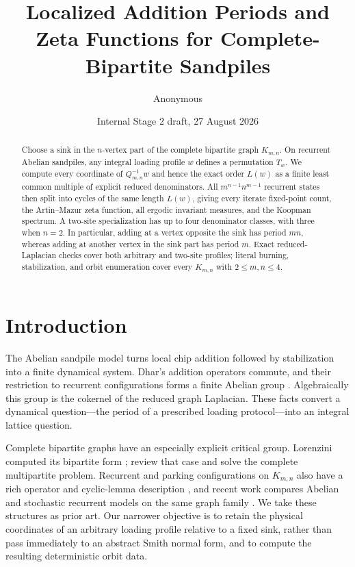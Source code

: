 \documentclass[11pt,a4paper]{amsart}
\title[Complete-bipartite sandpile translations]{Localized Addition Periods and Zeta Functions for Complete-Bipartite Sandpiles}
\author{Anonymous}
\date{Internal Stage 2 draft, 27 August 2026}
\theoremstyle{definition}
\theoremstyle{remark}
\begin{document}
\begin{abstract}
Choose a sink in the $n$-vertex part of the complete bipartite graph
$K_{m,n}$.  On recurrent Abelian sandpiles, any integral loading profile
$w$ defines a permutation $T_w$.  We compute every coordinate of
$Q_{m,n}^{-1}w$ and hence the exact order $L(w)$ as a finite least common
multiple of explicit reduced denominators.  All $m^{n-1}n^{m-1}$ recurrent
states then split into cycles of the same length $L(w)$, giving every iterate
fixed-point count, the Artin--Mazur zeta function, all ergodic invariant
measures, and the Koopman spectrum.  A two-site specialization has up to four
denominator classes, with three when $n=2$.  In particular, adding at a vertex opposite the sink
has period $mn$, whereas adding at another vertex in the sink part has period
$m$.  Exact reduced-Laplacian checks cover both arbitrary and two-site
profiles; literal burning, stabilization, and orbit enumeration cover every
$K_{m,n}$ with $2\leq m,n\leq4$.
\end{abstract}

\maketitle

\section{Introduction}

The Abelian sandpile model turns local chip addition followed by stabilization
into a finite dynamical system.  Dhar's addition operators commute, and their
restriction to recurrent configurations forms a finite Abelian group
\cite{Dhar1990,DharEtAl1995}.  Algebraically this group is the cokernel of the
reduced graph Laplacian.  These facts convert a dynamical question---the
period of a prescribed loading protocol---into an integral lattice question.

Complete bipartite graphs have an especially explicit critical group.
Lorenzini computed its bipartite form \cite{Lorenzini1991};
\citet{JacobsonEtAl2003} review that case and solve the complete multipartite
problem.  Recurrent and parking configurations on $K_{m,n}$ also have a rich
operator and cyclic-lemma description \cite{AvalEtAl2016}, and recent work
compares Abelian and stochastic recurrent models on the same graph family
\cite{SeligZhu2025}.  We take these structures as prior art.  Our narrower
objective is to retain the physical coordinates of an arbitrary loading
profile relative to a fixed sink, rather than pass immediately to an abstract
Smith normal form, and to compute the resulting deterministic orbit data.
\end{document}
